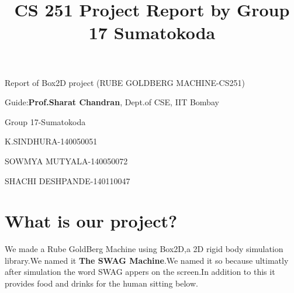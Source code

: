 \documentclass{report}
\title{CS 251 Project Report by Group 17 Sumatokoda}
\begin{document}
{\bf \centerline {Report of Box2D project (RUBE GOLDBERG MACHINE-CS251)}}  
{\centerline {Guide:{\bf {Prof.Sharat Chandran}}, Dept.of CSE, IIT Bombay}} 
{\bf \centerline{Group 17-Sumatokoda}} 
{\centerline {K.SINDHURA-140050051}} 
{\centerline {SOWMYA MUTYALA-140050072}} 
{\centerline {SHACHI DESHPANDE-140110047}}


\section{What is our project?}
We made a Rube GoldBerg Machine using Box2D,a 2D rigid body simulation library.We named it {\bf {The SWAG Machine}}.We named it so because ultimatly after simulation the word SWAG appers on the screen.In addition to this it provides food and drinks for the human sitting below.  \\ \\
\end{document}
